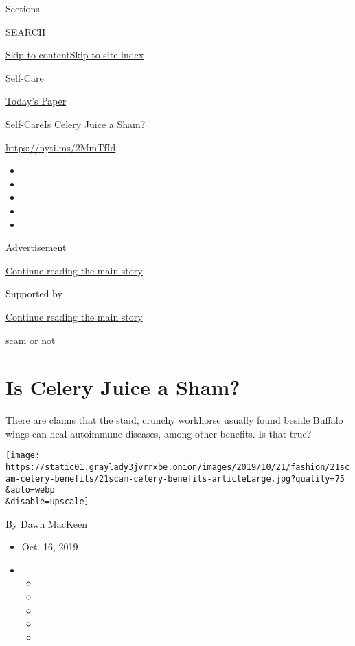 Sections

SEARCH

\protect\hyperlink{site-content}{Skip to
content}\protect\hyperlink{site-index}{Skip to site index}

\href{https://www.nytimes3xbfgragh.onion/section/style/self-care/}{Self-Care}

\href{https://myaccount.nytimes3xbfgragh.onion/auth/login?response_type=cookie\&client_id=vi}{}

\href{https://www.nytimes3xbfgragh.onion/section/todayspaper}{Today's
Paper}

\href{/section/style/self-care/}{Self-Care}\textbar{}Is Celery Juice a
Sham?

\url{https://nyti.ms/2MmTfId}

\begin{itemize}
\item
\item
\item
\item
\item
\end{itemize}

Advertisement

\protect\hyperlink{after-top}{Continue reading the main story}

Supported by

\protect\hyperlink{after-sponsor}{Continue reading the main story}

scam or not

\hypertarget{is-celery-juice-a-sham}{%
\section{Is Celery Juice a Sham?}\label{is-celery-juice-a-sham}}

There are claims that the staid, crunchy workhorse usually found beside
Buffalo wings can heal autoimmune diseases, among other benefits. Is
that true?

\texttt{[image: https://static01.graylady3jvrrxbe.onion/images/2019/10/21/fashion/21scam-celery-benefits/21scam-celery-benefits-articleLarge.jpg?quality=75\\\&auto=webp\\\&disable=upscale]}

By Dawn MacKeen

\begin{itemize}
\item
  Oct. 16, 2019
\item
  \begin{itemize}
  \item
  \item
  \item
  \item
  \item
  \end{itemize}
\end{itemize}

